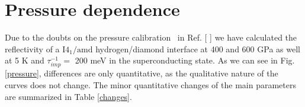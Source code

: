 \documentclass[11pt,titlepage,a4paper,twoside]{article}
\newcommand{\onlinecite}[1]{\hspace{-1 ex} \nocite{#1}\citenum{#1}}
\begin{document}
\section{Pressure dependence}



Due to the doubts on the pressure calibration~\cite{Eremets2017,Loubeyre2017,Liu2017,Goncharov2017} in Ref. [\onlinecite{Diaseaal1579}] we have calculated the reflectivity of a $\mathrm{I4_1/amd}$ hydrogen/diamond interface at 400 and 600 GPa as well at 5 K and $\tau_{imp}^{-1}=$ 200 meV in the superconducting
state. As we can see in Fig. \ref{pressure}, differences are only quantitative, as the qualitative nature of the curves does not change. The minor quantitative changes of the main parameters are summarized in Table \ref{changes}. 




 


\end{document}
